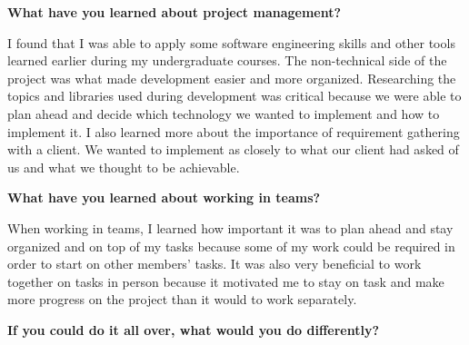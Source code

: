 \documentclass[onecolumn, draftclsnofoot,10pt, compsoc]{IEEEtran}
\begin{document}
\begin{flushleft}
\textbf{What have you learned about project management?}\par
I found that I was able to apply some software engineering skills and other tools learned earlier during my undergraduate courses. The non-technical side of the project was what made development easier and more organized. Researching the topics and libraries used during development was critical because we were able to plan ahead and decide which technology we wanted to implement and how to implement it. I also learned more about the importance of requirement gathering with a client. We wanted to implement as closely to what our client had asked of us and what we thought to be achievable. 

\textbf{What have you learned about working in teams?}\par
When working in teams, I learned how important it was to plan ahead and stay organized and on top of my tasks because some of my work could be required in order to start on other members’ tasks. It was also very beneficial to work together on tasks in person because it motivated me to stay on task and make more progress on the project than it would to work separately. 

\textbf{If you could do it all over, what would you do differently?}\par

\end{flushleft}
\end{document}
